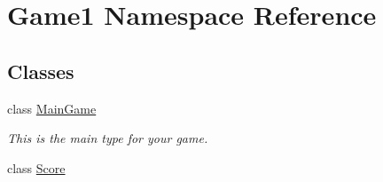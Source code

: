 \hypertarget{namespace_game1}{}\section{Game1 Namespace Reference}
\label{namespace_game1}
\subsection*{Classes}
\begin{DoxyCompactItemize}
\item 
class \mbox{\hyperlink{class_game1_1_1_main_game}{Main\+Game}}
\begin{DoxyCompactList}\small\item\em This is the main type for your game. \end{DoxyCompactList}\item 
class \mbox{\hyperlink{class_game1_1_1_score}{Score}}
\end{DoxyCompactItemize}
